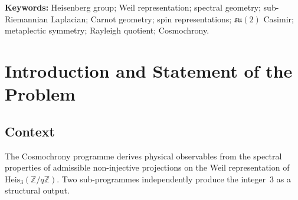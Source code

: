\documentclass[11pt,a4paper]{article}
\newcommand{\Heis}{\mathrm{Heis}_3}
\begin{document}
\begin{abstract}
    $A_H = A_z$.
    The numerical quantities are not symbol coefficients: they are compressions of the discrete
    Weil Laplacian $L_{\mathrm{Weil}} = 4I - W_a - W_a^\dagger - W_b - W_b^\dagger$ onto the three
    stored basis rows, which are pure Fourier modes: the central value is the flat-mode Rayleigh
    quotient $4 - 2 - 0 = 2$, exactly and for every tested pair, and the horizontal value is
    $4 - 2\cos(2\pi k/q)$ for the mode index $k$ selected by the pipeline.
    Consequently the central value is not identified with the Casimir eigenvalue, and no
    convergence of the isotropy gap is inferred from a fit: for these modes
    $A_H - 2 = 2(1 - \cos(2\pi k/q))$, so vanishing of the gap is equivalent to
    $\mathrm{dist}(k/q, \mathbb{Z}) \to 0$, a property of the mode-selection rule that remains to
    be established.
    The broader bridge to an extended target remains a missing construction.
    The existing Q5b spatial principal symbol has rank two and cannot equal the rank-three
    Casimir form; the conjecture therefore requires a new target.
    Separately, under Q5a's depth and weight hypotheses, no common scalar normalisation of its
    published admissibility form yields a toric differential limit.
  \end{abstract}

  \noindent\textbf{Keywords:} Heisenberg group; Weil representation; spectral geometry;
  sub-Riemannian Laplacian; Carnot geometry; spin representations; $\mathfrak{su}(2)$ Casimir;
  metaplectic symmetry; Rayleigh quotient; Cosmochrony.

  \clearpage
  \tableofcontents

  \clearpage
  \section{Introduction and Statement of the Problem}

    \subsection{Context}

      The Cosmochrony programme derives physical observables from the spectral properties of
      admissible non-injective projections on the Weil representation of $\Heis(\mathbb{Z}/q\mathbb{Z})$.
      Two sub-programmes independently produce the integer~$3$ as a structural output.
\end{document}

